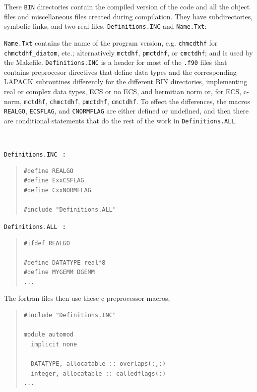 \documentclass[10pt,leqno, oneside]{book}
\begin{document}
These \verb#BIN# directories contain the compiled version of the code and all the object files and miscellaneous files created
during compilation.
They have subdirectories, symbolic links, and two real files, \verb#Definitions.INC# and \verb#Name.Txt#:


%
\verb#Name.Txt# contains the name of the program version, e.g. \verb#chmcdthf# for \verb#chmctdhf_diatom#, etc.;  
alternatively
\verb#mctdhf#, \verb#pmctdhf#, or \verb#cmctdhf#; and is used by the Makefile.
\verb#Definitions.INC# is a header for most of the \verb#.f90# files that contains preprocesor directives that define data 
types and the corresponding LAPACK subroutines differently for the different BIN directories, implementing real or 
complex data types, ECS or no ECS, and hermitian norm or, for ECS, c-norm, \verb#mctdhf#, \verb#chmctdhf#,
\verb#pmctdhf#, \verb#cmctdhf#.  To effect the differences, the macros \verb#REALGO#, 
\verb#ECSFLAG#, and \verb#CNORMFLAG# are either defined or undefined, and then there are conditional statements 
that do the rest of the work in \verb#Definitions.ALL#.

\

\verb#Definitions.INC# \ {\bf :}

{\small
\begin{quote}
\begin{verbatim}
#define REALGO
#define ExxCSFLAG
#define CxxNORMFLAG

#include "Definitions.ALL"
\end{verbatim}
\end{quote}}

\verb#Definitions.ALL# \ {\bf :}

{\small
\begin{quote}
\begin{verbatim}
#ifdef REALGO

#define DATATYPE real*8
#define MYGEMM DGEMM
...
\end{verbatim}
\end{quote}}
The fortran files then use these c preprocessor macros,
{\small
\begin{quote}
\begin{verbatim}
#include "Definitions.INC"

module automod
  implicit none

  DATATYPE, allocatable :: overlaps(:,:)
  integer, allocatable :: calledflags(:)
...
\end{verbatim}
\end{quote}}
\end{document}
